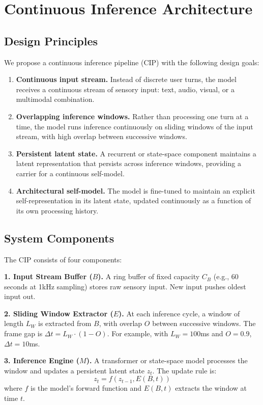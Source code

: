 \documentclass[12pt,a4paper]{article}
\begin{document}
\section{Continuous Inference Architecture}

\subsection{Design Principles}

We propose a continuous inference pipeline (CIP) with the following design goals:

\begin{enumerate}
\item \textbf{Continuous input stream.} Instead of discrete user turns, the model receives a continuous stream of sensory input: text, audio, visual, or a multimodal combination.
\item \textbf{Overlapping inference windows.} Rather than processing one turn at a time, the model runs inference continuously on sliding windows of the input stream, with high overlap between successive windows.
\item \textbf{Persistent latent state.} A recurrent or state-space component maintains a latent representation that persists across inference windows, providing a carrier for a continuous self-model.
\item \textbf{Architectural self-model.} The model is fine-tuned to maintain an explicit self-representation in its latent state, updated continuously as a function of its own processing history.
\end{enumerate}

\subsection{System Components}

The CIP consists of four components:

\textbf{1. Input Stream Buffer ($B$).} A ring buffer of fixed capacity $C_B$ (e.g., 60 seconds at 1kHz sampling) stores raw sensory input. New input pushes oldest input out.

\textbf{2. Sliding Window Extractor ($E$).} At each inference cycle, a window of length $L_W$ is extracted from $B$, with overlap $O$ between successive windows. The frame gap is $\Delta t = L_W \cdot (1 - O)$. For example, with $L_W = 100$ms and $O = 0.9$, $\Delta t = 10$ms.

\textbf{3. Inference Engine ($M$).} A transformer or state-space model processes the window and updates a persistent latent state $z_t$. The update rule is:
\[
z_t = f(z_{t-1}, E(B, t))
\]
where $f$ is the model's forward function and $E(B, t)$ extracts the window at time $t$.
\end{document}
